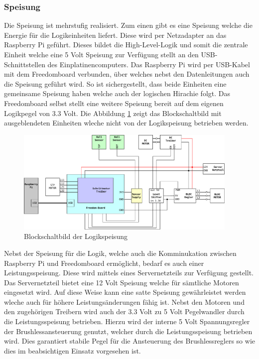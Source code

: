 \subsubsection{Speisung}

Die Speisung ist mehrstufig realisiert. Zum einen gibt es eine Speisung
welche die Energie für die Logikeinheiten liefert. Diese wird per Netzadapter
an das Raspberry Pi geführt. Dieses bildet die High-Level-Logik und somit die
zentrale Einheit welche eine 5 Volt Speisung zur Verfügung stellt an den
USB-Schnittstellen des Einplatinencomputers. Das Raspberry Pi wird per
USB-Kabel mit dem Freedomboard verbunden, über welches nebst den
Datenleitungen auch die Speisung geführt wird. So ist sichergestellt,
dass beide Einheiten eine gemeinsame Speisung haben welche auch der
logischen Hirachie folgt. Das Freedomboard selbst stellt eine weitere
Speisung bereit auf dem eigenen Logikpegel von 3.3 Volt. Die Abbildung
\ref{fig:et-block_logic} zeigt das Blockschaltbild mit ausgeblendeten
Einheiten wleche nicht von der Logikspeisung betrieben werden.

\begin{figure}[h!]
	\centering
	\includegraphics[width=0.95\textwidth]{../../fig/blockdiagram_logic.pdf}
	\caption{Blockschaltbild der Logikspeisung}
	\label{fig:et-block_logic}
\end{figure}

Nebst der Speisung für die Logik, welche auch die Komminukation zwischen
Raspberry Pi und Freedomboard ermöglicht, bedarf es auch einer
Leistungsspeisung. Diese wird mittels eines Servernetzteils zur Verfügung
gestellt. Das Servernetzteil bietet eine 12 Volt Speisung welche für sämtliche
Motoren eingesetzt wird. Auf diese Weise kann eine satte Speisung
gewährleistet werden wleche auch für höhere Leistungsänderungen fähig ist.
Nebst den Motoren und den zugehörigen Treibern wird auch der 3.3 Volt zu 
5 Volt Pegelwandler durch die Leistungsspeisung betrieben. Hierzu wird der
interne 5 Volt Spannungsregler der Brushlessansteuerung genutzt, welcher durch
die Leistungsspeisung betrieben wird. Dies garantiert stabile Pegel für die
Ansteuerung des Brushlessreglers so wie dies im beabsichtigen Einsatz
vorgesehen ist.



